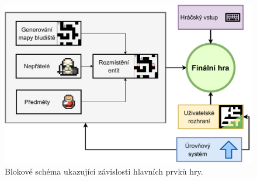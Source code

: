 \begin{figure}[H]
    \centering
    \includegraphics[width=\textwidth]{obrazky-figures/ch4/blokove_schema_hry.pdf}
    \caption{Blokové schéma ukazující závislosti hlavních prvků hry.}
    \label{fig:schema_hry}
\end{figure}

